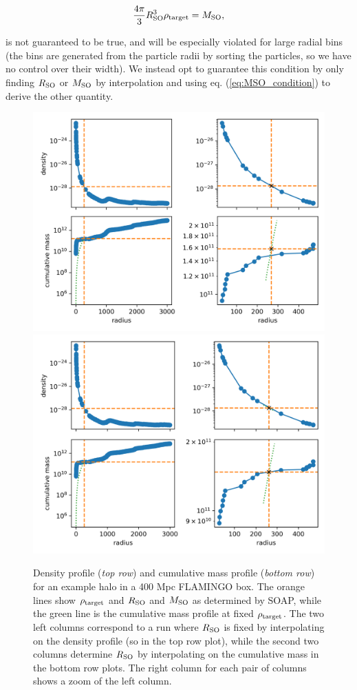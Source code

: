 \documentclass{article}
\begin{document}
\begin{equation}
    \frac{4\pi{}}{3} R_{\rm{}SO}^3 \rho{}_{\rm{}target} = M_{\rm{}SO},\label{eq:MSO_condition}
\end{equation}

is not guaranteed to be true, and will be especially violated for large radial bins (the bins are generated 
from the particle radii by sorting the particles, so we have no control over their width). We instead opt to 
guarantee this condition by only finding $R_{\rm{}SO}$ or $M_{\rm{}SO}$ by interpolation and using eq. 
(\ref{eq:MSO_condition}) to derive the other quantity.

\begin{figure}
    \centering
    \includegraphics[width=0.48\textwidth{}]{image7.png}
    \includegraphics[width=0.48\textwidth{}]{image4.png}
    \caption{Density profile (\emph{top row}) and cumulative mass profile (\emph{bottom row}) for an example 
    halo in a 400 Mpc FLAMINGO box. The orange lines show $\rho{}_{\rm{}target}$ and $R_{\rm{}SO}$ and 
    $M_{\rm{}SO}$ as determined by SOAP, while the green line is the cumulative mass profile at fixed 
    $\rho{}_{\rm{}target}$. The two left columns correspond to a run where $R_{\rm{}SO}$ is fixed by 
    interpolating on the density profile (so in the top row plot), while the second two columns determine 
    $R_{\rm{}SO}$ by interpolating on the cumulative mass in the bottom row plots. The right column for each 
    pair of columns shows a zoom of the left column.}
    \label{fig:MSO_vs_RSO}
\end{figure}
\end{document}
